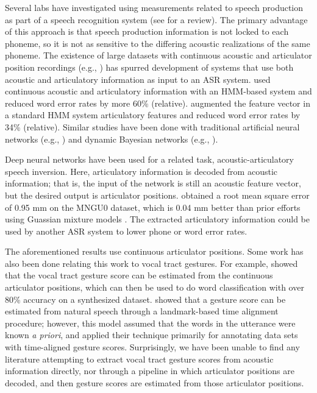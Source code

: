 {Several labs have investigated
using measurements
related to speech production
as part of a speech recognition system
(see \citealt{king2007} for a review).
The primary advantage of this approach
is that speech production information
is not locked to each phoneme,
so it is not as sensitive to the
differing acoustic realizations
of the same phoneme.
The existence of large datasets
with continuous acoustic
and articulator position recordings
(e.g., \citealt{westbury1990,wrench2000,steiner2012})
has spurred development of
systems that use both
acoustic and articulatory information
as input to an ASR system.
\citet{zlokarnik1995}
used continuous acoustic and articulatory
information with an HMM-based system
and reduced word error rates
by more 60\% (relative).
\citet{eide2001}
augmented the feature vector
in a standard HMM system
articulatory features and
reduced word error rates
by 34\% (relative).
Similar studies have been done
with traditional artificial neural networks
(e.g., \citealt{kirchhoff2002})
and dynamic Bayesian networks
(e.g., \citealt{stephenson2000,stephenson2004}).

Deep neural networks have been used for
a related task,
acoustic-articulatory speech inversion.
Here, articulatory information
is decoded from acoustic information;
that is, the input of the network
is still an acoustic feature vector,
but the desired output
is articulator positions.
\citet{uria2011}
obtained a root mean square error
of 0.95 mm on the MNGU0 dataset,
which is 0.04 mm better than prior
efforts using Guassian mixture models
\citep{richmond2009}.
The extracted articulatory information
could be used by another ASR system
to lower phone or word error rates.

The aforementioned results
use continuous articulator positions.
Some work has also been done
relating this work to
vocal tract gestures.
For example,
\citet{zhuang2008,zhuang2009}
showed that the vocal tract gesture score
can be estimated
from the continuous articulator positions,
which can then be used
to do word classification with
over 80\% accuracy on a synthesized dataset.
\citet{nam2010,nam2012}
showed that a gesture score
can be estimated from natural speech
through a landmark-based time alignment procedure;
however, this model assumed that the
words in the utterance were known \textit{a priori},
and applied their technique primarily
for annotating data sets with time-aligned gesture scores.
Surprisingly, we have been unable to find any literature
attempting to extract vocal tract gesture scores
from acoustic information directly,
nor through a pipeline in which
articulator positions are decoded,
and then gesture scores are estimated
from those articulator positions.

}
